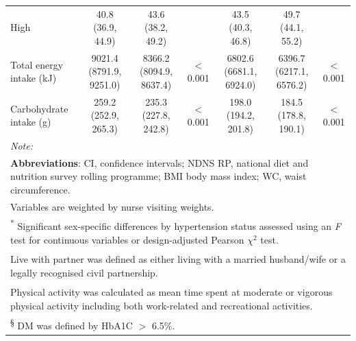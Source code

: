 \begin{table}
\begin{tabular}[t]{lcccccc}
		\hspace{1em}High & 40.8 (36.9, 44.9) & 43.6 (38.2, 49.2) &  & 43.5 (40.3, 46.8) & 49.7 (44.1, 55.2) & \\
		Total energy intake (kJ) & 9021.4 (8791.9, 9251.0) & 8366.2 (8094.9, 8637.4) & < 0.001 & 6802.6 (6681.1, 6924.0) & 6396.7 (6217.1, 6576.2) & < 0.001\\
		Carbohydrate intake (g) & 259.2 (252.9, 265.3) & 235.3 (227.8, 242.8) & < 0.001 & 198.0 (194.2, 201.8) & 184.5 (178.8, 190.1) & < 0.001\\
		\bottomrule
		\multicolumn{7}{l}{{\scriptsize \textit{Note: }}}\\
		\multicolumn{7}{l}{{\scriptsize \textbf{Abbreviations}: CI, confidence intervals; NDNS RP, national diet and nutrition survey rolling programme; BMI body mass index; WC, waist circumference.}}\\
		\multicolumn{7}{l}{{\scriptsize Variables are weighted by nurse visiting weights.}}\\
		\multicolumn{7}{l}{{\scriptsize \textsuperscript{*} Significant sex-specific differences by hypertension status assessed using an \textit{F} test for continuous variables or design-adjusted Pearson $\chi^2$ test.}}\\
		\multicolumn{7}{l}{{\scriptsize \textsuperscript{\ddag} Live with partner was defined as either living with a married husband/wife or a legally recognised civil partnership.}}\\
		\multicolumn{7}{l}{{\scriptsize \textsuperscript{\dag} Physical activity was calculated as mean time spent at moderate or vigorous physical activity including both work-related and recreational activities.}}\\
		\multicolumn{7}{l}{{\scriptsize \textsuperscript{\S}  DM was defined by HbA1C $>$ 6.5\%.}}
	\end{tabular}
\end{table}




